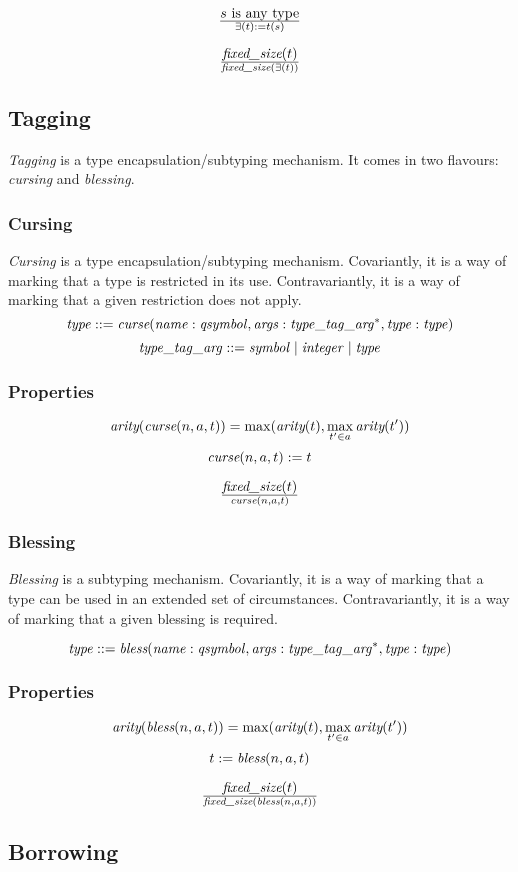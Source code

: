 \documentclass[a4paper]{report}
\newcommand\arity{{\ensuremath\textit{arity}}}
\newcommand\fixedsize{{\ensuremath\textit{fixed\_size}}}
\newcommand\tyBless{{\ensuremath\textit{bless}}}
\newcommand\tyCurse{{\ensuremath\textit{curse}}}
\begin{document}
$${s \textrm{ is any type}} \over \exists(t) := t(s)$$

$$\fixedsize(t) \over \fixedsize(\exists(t))$$

\subsection{Tagging}
\emph{Tagging} is a type encapsulation/subtyping mechanism.
It comes in two flavours: \emph{cursing} and \emph{blessing}.

\subsubsection{Cursing}
\emph{Cursing} is a type encapsulation/subtyping mechanism.
Covariantly, it is a way of marking that a type is restricted in its use.
Contravariantly, it is a way of marking that a given restriction does not apply.
$$
\it type ::= \tyCurse(name : qsymbol, args : type\_tag\_arg^*, type : type)
$$
$$
\it type\_tag\_arg ::= symbol \;|\; integer \;|\; type
$$

\subsubsection*{Properties}
$$
\arity(\tyCurse(n,a,t)) = \max(\arity(t), \max_{t' \in a} \arity(t'))
$$
$$
\tyCurse(n,a,t) := t
$$

$$\fixedsize(t) \over \tyCurse(n,a,t)$$

\subsubsection{Blessing}
\emph{Blessing} is a subtyping mechanism.
Covariantly, it is a way of marking that a type can be used in an
extended set of circumstances.
Contravariantly, it is a way of marking that a given blessing is required.

$$
\it type ::= \tyBless(name : qsymbol, args : type\_tag\_arg^*, type : type)
$$

\subsubsection*{Properties}
$$
\arity(\tyBless(n,a,t)) = \max(\arity(t), \max_{t' \in a} \arity(t'))
$$
$$
t := \tyBless(n,a,t)
$$

$$\fixedsize(t) \over \fixedsize(\tyBless(n,a,t))$$

\subsection{Borrowing}
\end{document}
